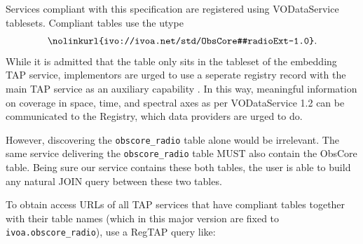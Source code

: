 \documentclass[11pt,a4paper]{ivoa}
\begin{document}
Services compliant with this specification are registered using
VODataService \citep{2021ivoa.spec.1102D} tablesets. 
Compliant tables use the utype
$$ \hbox{\nolinkurl{ivo://ivoa.net/std/ObsCore#radioExt-1.0}.} $$
%
While it is admitted that the table only sits in the tableset of the
embedding TAP service, implementors are urged to use a seperate registry
record with the main TAP service as an auxiliary capability
\citep{2019ivoa.spec.0520D}. In this way, meaningful information
on coverage in space, time, and spectral axes as per VODataService 1.2 can
be communicated to the Registry, which data providers are urged
to do.

However, discovering the \verb|obscore_radio| table alone would be  irrelevant. The same service delivering the \verb|obscore_radio| table MUST also contain the ObsCore table.   
Being sure our service  contains these both tables,
the user is able  to  build any natural JOIN query between these two tables. 



To obtain access URLs of all TAP services that have compliant tables
together with their table names (which in this major version are fixed
to \verb|ivoa.obscore_radio|), use a RegTAP \citep{2019ivoa.spec.1011D}
query like:
\end{document}
